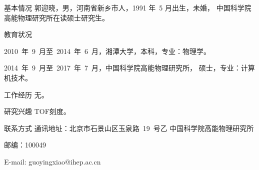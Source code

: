 \begin{resume}

\begin{resumesection}{基本情况}
郭迎晓，男，河南省新乡市人，1991 年~5 月出生，未婚，
中国科学院高能物理研究所在读硕士研究生。
\end{resumesection}

\begin{resumelist}{教育状况}


2010~年~9~月至~2014~年~6~月，湘潭大学，本科，专业：物理学。

2014~年~9~月至~2017~年~7~月，中国科学院高能物理研究所， 硕士，专业：计算机技术。
\end{resumelist}

\begin{resumelist}{工作经历}
无。
\end{resumelist}

\begin{resumelist}{研究兴趣}
TOF刻度。
\end{resumelist}

\begin{resumelist}{联系方式}
通讯地址：北京市石景山区玉泉路~19~号乙 中国科学院高能物理研究所

邮编：100049

E-mail: guoyingxiao@ihep.ac.cn
\end{resumelist}

\end{resume}
